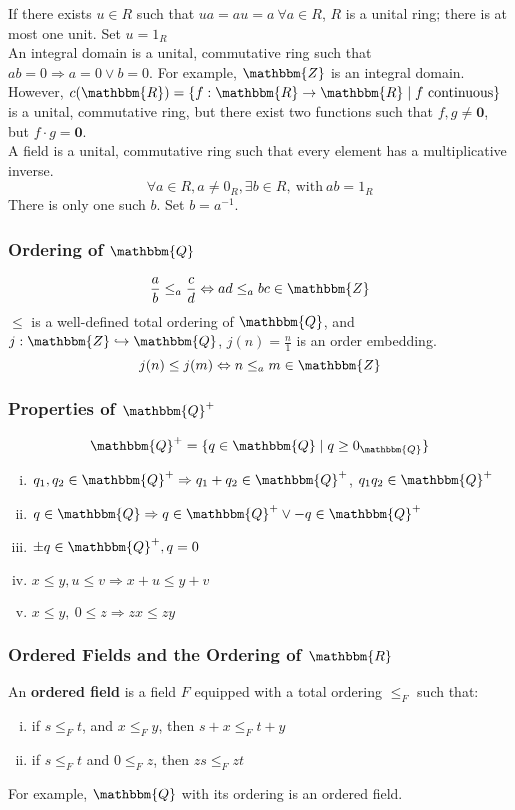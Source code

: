 \documentclass[10pt]{extarticle}
\renewcommand{\mathbf}[1]{\mathbold{#1}}
\newcommand{\Q}{\mathbbm{Q}}
\newcommand{\Z}{\mathbbm{Z}}
\newcommand{\R}{\mathbbm{R}}
\begin{document}
        If there exists $u\in R$ such that $ua = au = a~\forall a\in R$, $R$ is a unital ring; there is at most one unit. Set $u = 1_R$\\

        An integral domain is a unital, commutative ring such that $ab = 0 \Rightarrow a=0\vee b=0$. For example, $\Z$ is an integral domain. However, $c(\R) = \{f:\R \rightarrow \R\mid f~\text{continuous}\}$ is a unital, commutative ring, but there exist two functions such that $f,g\neq \mathbf{0}$, but $f\cdot g = \mathbf{0}$.\\

        A field is a unital, commutative ring such that every element has a multiplicative inverse.
        \[
          \forall a\in R, a\neq 0_R,\exists b\in R,~\text{with}~ab = 1_R
        \] 
        There is only one such $b$. Set $b = a^{-1}$.
    \subsubsection{Ordering of $\Q$}%
    \[
      \frac{a}{b} \leq_a \frac{c}{d} \Leftrightarrow ad\leq_{a} bc \in \Z
    \] 
      $\leq$ is a well-defined total ordering of $\Q$, and $j: \Z\hookrightarrow \Q$, $j(n) = \frac{n}{1}$ is an order embedding.
      \[
        j(n) \leq j(m) \Leftrightarrow n\leq_a m\in \Z
      \] 
    \subsubsection{Properties of $\Q^+$}%
      \[
        \Q^+ = \{q \in \Q \mid q \geq 0_{\Q}\}
      \] 
      \begin{enumerate}[(i)]
        \item $q_1,q_2\in \Q^+ \Rightarrow q_1 + q_2 \in \Q^+$, $q_1q_2 \in \Q^+$
        \item $q\in \Q \Rightarrow q\in \Q^+ \vee -q\in \Q^+$
        \item $\pm q\in \Q^+,q = 0$
        \item $x\leq y,u\leq v \Rightarrow x+u \leq y+v$
        \item $x\leq y,~0\leq z \Rightarrow zx \leq zy$
      \end{enumerate}
    \subsubsection{Ordered Fields and the Ordering of $\R$}%
    An \textbf{ordered field} is a field $F$ equipped with a total ordering $\leq_{F}$ such that:
    \begin{enumerate}[(i)]
      \item if $s\leq_{F} t$, and $x\leq_{F} y$, then $s + x \leq_{F} t + y$
      \item if $s\leq_{F} t$ and $0\leq_{F} z$, then $zs\leq_{F} zt$
    \end{enumerate}
    For example, $\Q$ with its ordering is an ordered field.\\
\end{document}
